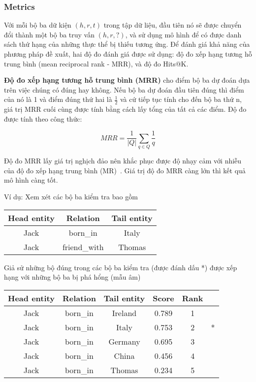 \subsubsection{Metrics}

Với mỗi bộ ba dữ kiện $(h, r, t)$ trong tập dữ liệu, đầu tiên nó sẽ được chuyển đổi thành một bộ ba truy vấn $(h, r, ?)$, và sử dụng mô hình để có được danh sách thứ hạng của những thực thể bị thiếu tương ứng. Để đánh giá khả năng của phương pháp đề xuất, hai độ đo đánh giá được sử dụng: độ đo xếp hạng tương hỗ trung bình (mean reciprocal rank - MRR), và độ đo Hits@K.

\textbf{Độ đo xếp hạng tương hỗ trung bình (MRR)} cho điểm bộ ba dự đoán dựa trên việc chúng có đúng hay không. Nếu bộ ba dự đoán đầu tiên đúng thì điểm của nó là 1 và điểm đúng thứ hai là \(\frac{1}{2}\) và cứ tiếp tục tính cho đến bộ ba thứ n, giá trị MRR cuối cùng được tính bằng cách lấy tổng của tất cả các điểm. Độ đo được tính theo công thức:

\begin{equation}
\textit{MRR} = \frac{1}{|Q|} \sum_{q\in Q} \frac{1}{q}
\end{equation}

Độ đo MRR lấy giá trị nghịch đảo nên khắc phục được độ nhạy cảm với nhiễu của độ đo xếp hạng trung bình (MR)~\cite{talukdar2021okgit}. Giá trị độ đo MRR càng lớn thì kết quả mô hình càng tốt.

Ví dụ: Xem xét các bộ ba kiểm tra bao gồm

\begin{table}[H]
\centering
\begin{tabular}{ccc}
\hline
Head entity &  Relation & Tail entity \\
\hline
Jack  & born\_in  & Italy \\
Jack  & friend\_with  & Thomas \\
\hline
\end{tabular}
\end{table}

Giả sử những bộ đúng trong các bộ ba kiểm tra (được đánh dấu *) được xếp hạng với những bộ ba bị phá hổng (mẫu âm)

\begin{table}[H]
\centering
\begin{tabular}{cccccc}
\hline
Head entity &  Relation & Tail entity & Score & Rank & \\
\hline
Jack &  born\_in &  Ireland    &    0.789   &   1&\\
Jack &  born\_in &  Italy      &    0.753    &  2&  *\\
Jack &  born\_in &  Germany    &    0.695    &  3&\\
Jack &  born\_in &  China      &    0.456    &  4&\\
Jack &  born\_in &  Thomas     &    0.234    &  5&\\
\hline
\end{tabular}
\end{table}


